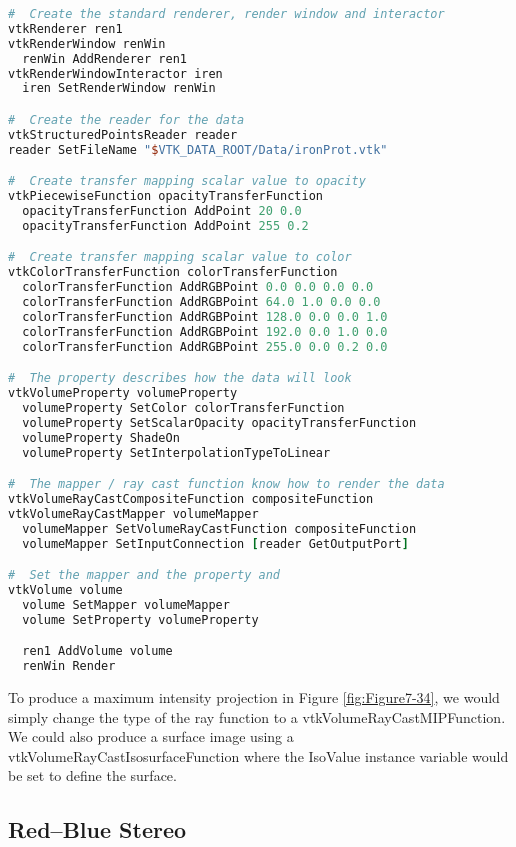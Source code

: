 \begin{lstlisting}[language=TCL, caption={Volume rendering of a high potential iron protein.}]
#  Create the standard renderer, render window and interactor
vtkRenderer ren1
vtkRenderWindow renWin
  renWin AddRenderer ren1
vtkRenderWindowInteractor iren
  iren SetRenderWindow renWin

#  Create the reader for the data
vtkStructuredPointsReader reader
reader SetFileName "$VTK_DATA_ROOT/Data/ironProt.vtk"

#  Create transfer mapping scalar value to opacity
vtkPiecewiseFunction opacityTransferFunction
  opacityTransferFunction AddPoint 20 0.0
  opacityTransferFunction AddPoint 255 0.2

#  Create transfer mapping scalar value to color
vtkColorTransferFunction colorTransferFunction
  colorTransferFunction AddRGBPoint 0.0 0.0 0.0 0.0
  colorTransferFunction AddRGBPoint 64.0 1.0 0.0 0.0
  colorTransferFunction AddRGBPoint 128.0 0.0 0.0 1.0
  colorTransferFunction AddRGBPoint 192.0 0.0 1.0 0.0
  colorTransferFunction AddRGBPoint 255.0 0.0 0.2 0.0

#  The property describes how the data will look
vtkVolumeProperty volumeProperty
  volumeProperty SetColor colorTransferFunction
  volumeProperty SetScalarOpacity opacityTransferFunction
  volumeProperty ShadeOn
  volumeProperty SetInterpolationTypeToLinear

#  The mapper / ray cast function know how to render the data
vtkVolumeRayCastCompositeFunction compositeFunction
vtkVolumeRayCastMapper volumeMapper
  volumeMapper SetVolumeRayCastFunction compositeFunction
  volumeMapper SetInputConnection [reader GetOutputPort]

#  Set the mapper and the property and
vtkVolume volume
  volume SetMapper volumeMapper
  volume SetProperty volumeProperty

  ren1 AddVolume volume
  renWin Render
\end{lstlisting}

To produce a maximum intensity projection in Figure \ref{fig:Figure7-34}, we would simply change the type of the ray function to a vtkVolumeRayCastMIPFunction. We could also produce a surface image using a vtkVolumeRayCastIsosurfaceFunction where the IsoValue instance variable would be set to define the surface.


\subsection{Red--Blue Stereo}

